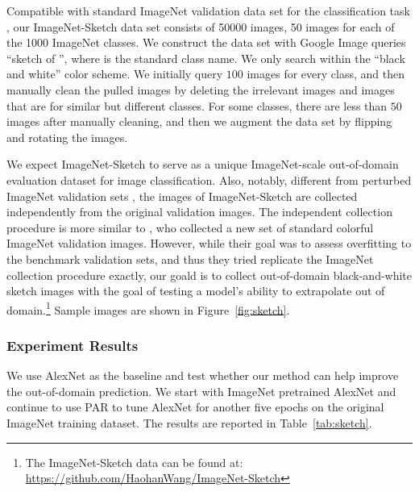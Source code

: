 \documentclass{article}
\begin{document}
Compatible with standard ImageNet validation data set
for the classification task \citep{Deng09imagenet},
our ImageNet-Sketch data set consists of 50000 images, 
50 images for each of the 1000 ImageNet classes. 
We construct the data set with Google Image queries 
``sketch of \underline{\hspace{0.8cm}}'',
where \underline{\hspace{0.8cm}} is the standard class name. 
We only search within the ``black and white'' color scheme.
We initially query $100$ images for every class, 
and then manually clean the pulled images 
by deleting the irrelevant images and images 
that are for similar but different classes. 
For some classes, there are less than $50$ images after manually cleaning, 
and then we augment the data set by flipping and rotating the images. 

We expect ImageNet-Sketch to serve as a unique ImageNet-scale 
out-of-domain evaluation dataset for image classification. 
Also, notably, different from perturbed ImageNet validation sets \citep{geirhos2018imagenettrained,hendrycks2018benchmarking}, 
the images of ImageNet-Sketch are collected independently 
from the original validation images. 
The independent collection procedure is more similar to \citep{recht2019imagenet}, 
who collected a new set of standard colorful ImageNet validation images. 
However, while their goal was to assess overfitting to the benchmark validation sets,
and thus they tried replicate the ImageNet collection procedure exactly,
our goald is to collect out-of-domain black-and-white sketch images 
with the goal of testing a model's ability 
to extrapolate out of domain.\footnote{The ImageNet-Sketch data can be found at: \href{https://github.com/HaohanWang/ImageNet-Sketch}{https://github.com/HaohanWang/ImageNet-Sketch}} 
Sample images are shown in Figure~\ref{fig:sketch}.


\subsubsection{Experiment Results}
We use AlexNet as the baseline and test whether our method 
can help improve the out-of-domain prediction. 
We start with 
ImageNet pretrained AlexNet 
and continue to use PAR to tune AlexNet for another five epochs
on the original ImageNet training dataset. 
The results are reported in Table~\ref{tab:sketch}.
\end{document}
